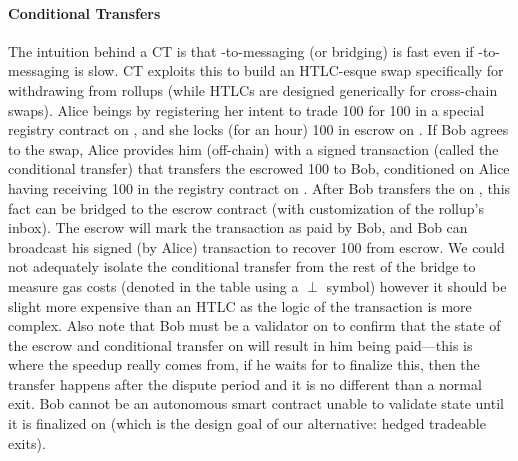 \paragraph*{Conditional Transfers} The intuition behind a CT is that \layerone-to-\layertwo messaging (or bridging) is fast even if \layertwo-to-\layerone messaging is slow. CT exploits this to build an HTLC-esque swap specifically for withdrawing from rollups (while HTLCs are designed generically for cross-chain swaps). Alice beings by registering her intent to trade 100 \ethtwo for 100 \ethone in a special registry contract on \layerone, and she locks (\eg for an hour) 100 \ethtwo in escrow on \layertwo. If Bob agrees to the swap, Alice provides him (off-chain) with a signed transaction (called the conditional transfer) that transfers the escrowed 100 \ethtwo to Bob, conditioned on Alice having receiving 100 \ethone in the registry contract on \layerone. After Bob transfers the \ethone on \layerone, this fact can be bridged to the \layertwo escrow contract (with customization of the rollup's inbox). The escrow will mark the \layerone transaction as paid by Bob, and Bob can broadcast his signed (by Alice) \layertwo transaction to recover 100 \ethtwo from escrow. We could not adequately isolate the conditional transfer from the rest of the bridge to measure gas costs (denoted in the table using a $\perp$ symbol) however it should be slight more expensive than an HTLC as the logic of the transaction is more complex. Also note that Bob must be a validator on \layertwo to confirm that the state of the escrow and conditional transfer on \layertwo will result in him being paid---this is where the speedup really comes from, if he waits for \layerone to finalize this, then the transfer happens after the dispute period and it is no different than a normal exit. Bob cannot be an autonomous \layerone smart contract unable to validate \layertwo state until it is finalized on \layerone (which is the design goal of our alternative: hedged tradeable exits). 


